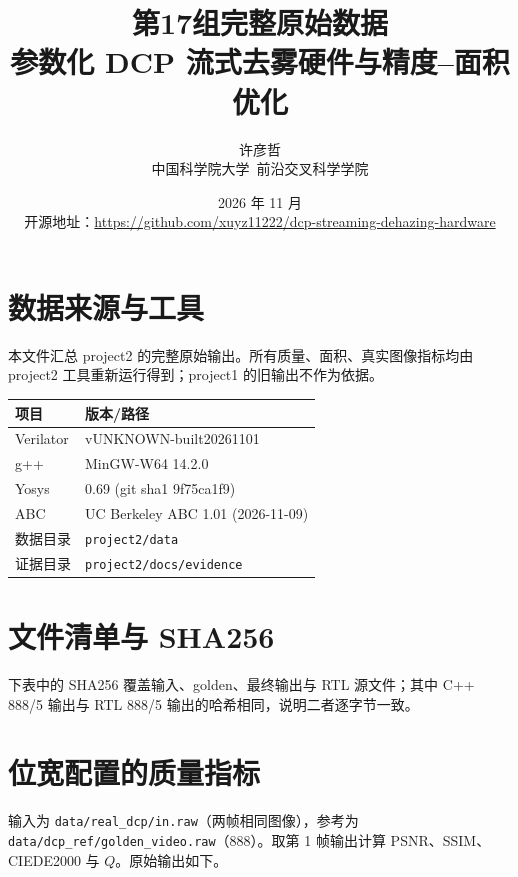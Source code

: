 \documentclass[UTF8,11pt,a4paper,fontset=windows]{ctexart}
\title{\textbf{第17组\quad 完整原始数据}\\[0.4em]
\large 参数化 DCP 流式去雾硬件与精度--面积优化}
\author{许彦哲\quad 202618023429017\\ 中国科学院大学\ 前沿交叉科学学院}
\date{2026 年 11 月\\[0.3em]
\small 开源地址：\url{https://github.com/xuyz11222/dcp-streaming-dehazing-hardware}}
\begin{document}
\maketitle
\thispagestyle{empty}

\section{数据来源与工具}

本文件汇总 project2 的完整原始输出。所有质量、面积、真实图像指标均由 project2 工具重新运行得到；project1 的旧输出不作为依据。

\begin{center}
\small
\begin{tabular}{ll}
\toprule
项目 & 版本/路径\\
\midrule
Verilator & vUNKNOWN-built20261101\\
g++ & MinGW-W64 14.2.0\\
Yosys & 0.69 (git sha1 9f75ca1f9)\\
ABC & UC Berkeley ABC 1.01 (2026-11-09)\\
数据目录 & \texttt{project2/data}\\
证据目录 & \texttt{project2/docs/evidence}\\
\bottomrule
\end{tabular}
\end{center}

\section{文件清单与 SHA256}

下表中的 SHA256 覆盖输入、golden、最终输出与 RTL 源文件；其中 C++ 888/5 输出与 RTL 888/5 输出的哈希相同，说明二者逐字节一致。


\section{位宽配置的质量指标}

输入为 \texttt{data/real\_dcp/in.raw}（两帧相同图像），参考为 \texttt{data/dcp\_ref/golden\_video.raw}（888）。取第 1 帧输出计算 PSNR、SSIM、CIEDE2000 与 $Q$。原始输出如下。

\end{document}
